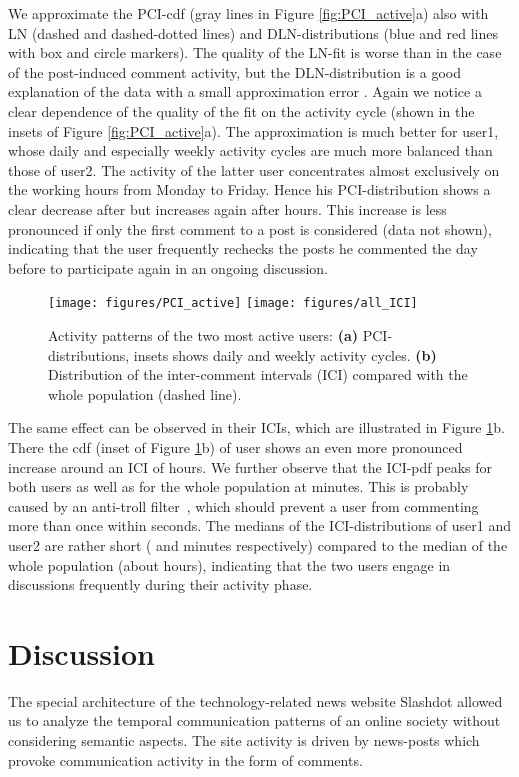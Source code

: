 \documentclass[twoside,11pt]{article}
\begin{document}
We approximate the PCI-cdf (gray lines in Figure
\ref{fig:PCI_active}a) also with LN (dashed and dashed-dotted lines)
and DLN-distributions (blue and red lines with box and circle
markers). The quality of the LN-fit is worse than in the case of the
post-induced comment activity, but the DLN-distribution is a good
explanation of the data with a small approximation error .
Again we notice a clear dependence of the quality of the fit on the
activity cycle (shown in the insets of Figure \ref{fig:PCI_active}a).
The approximation is much better for user1, whose daily and especially
weekly activity cycles are much more balanced than those of user2. The
activity of the latter user concentrates almost exclusively on the
working hours from Monday to Friday.  Hence his PCI-distribution shows
a clear decrease after  but increases again after  hours. This
increase is less pronounced if only the first comment to a post is
considered (data not shown), indicating that the user frequently
rechecks the posts he commented the day before to participate again in
an ongoing discussion.

\begin{figure}[!t]\centering
  \texttt{[image: figures/PCI\_active]}
  \texttt{[image: figures/all\_ICI]}
  \caption{Activity patterns of the two most active users:
    \textbf{(a)} PCI-distributions, insets shows daily and weekly
    activity cycles.  
    \textbf{(b)} Distribution of the inter-comment intervals (ICI)
    compared with the whole population (dashed line).}
\label{fig:PCI_active}
\label{fig:ICI_active}
\end{figure}

The same effect can be observed in their ICIs, which are illustrated
in Figure \ref{fig:ICI_active}b.  There the cdf (inset of Figure
\ref{fig:ICI_active}b) of user shows an even more pronounced
increase around an ICI of  hours. We further observe that the
ICI-pdf peaks for both users as well as for the whole population at
 minutes. This is probably caused by an anti-troll
filter~\citep{SlashdotFAQ}, which should prevent a user from commenting
more than once within  seconds.  The medians of the
ICI-distributions of user1 and user2 are rather short ( and 
minutes respectively) compared to the median of the whole population
(about  hours), indicating that the two users engage in
discussions frequently during their activity phase.

\section{Discussion}
\label{sec:discussion}\noindent
The special architecture of the technology-related news website
Slashdot allowed us to analyze the temporal communication patterns of
an online society without considering semantic aspects. The site
activity is driven by news-posts which provoke communication activity
in the form of comments.
\end{document}
